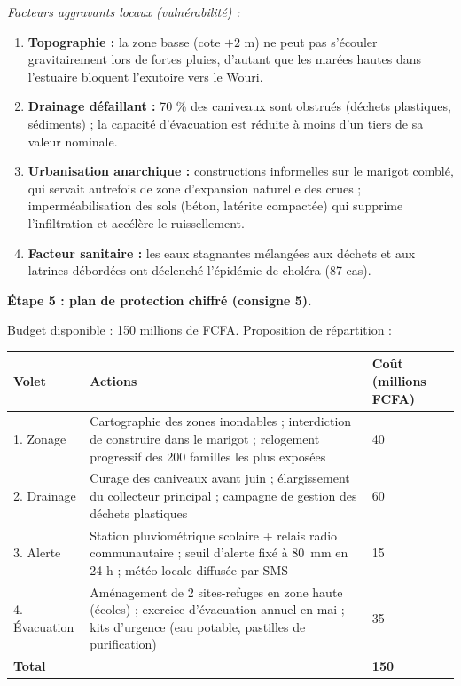 \documentclass[11pt]{article}
\begin{document}
\begin{exoresolu}
\emph{Facteurs aggravants locaux (vulnérabilité) :}
\begin{enumerate}
\item \textbf{Topographie :} la zone basse (cote $+2$ m) ne peut pas s'écouler gravitairement lors de fortes pluies, d'autant que les marées hautes dans l'estuaire bloquent l'exutoire vers le Wouri.
\item \textbf{Drainage défaillant :} 70 \% des caniveaux sont obstrués (déchets plastiques, sédiments) ; la capacité d'évacuation est réduite à moins d'un tiers de sa valeur nominale.
\item \textbf{Urbanisation anarchique :} constructions informelles sur le marigot comblé, qui servait autrefois de zone d'expansion naturelle des crues ; imperméabilisation des sols (béton, latérite compactée) qui supprime l'infiltration et accélère le ruissellement.
\item \textbf{Facteur sanitaire :} les eaux stagnantes mélangées aux déchets et aux latrines débordées ont déclenché l'épidémie de choléra (87 cas).
\end{enumerate}

\textbf{Étape 5 : plan de protection chiffré (consigne 5).}

Budget disponible : 150 millions de FCFA. Proposition de répartition :

\begin{center}
\begin{tabularx}{\linewidth}{|l|X|X|}
\hline
\rowcolor{popblueL}
Volet & Actions & Coût (millions FCFA) \\
\hline
1. Zonage & Cartographie des zones inondables ; interdiction de construire dans le marigot ; relogement progressif des 200 familles les plus exposées & 40 \\
\hline
2. Drainage & Curage des caniveaux avant juin ; élargissement du collecteur principal ; campagne de gestion des déchets plastiques & 60 \\
\hline
3. Alerte & Station pluviométrique scolaire + relais radio communautaire ; seuil d'alerte fixé à \SI{80}{mm} en 24 h ; météo locale diffusée par SMS & 15 \\
\hline
4. Évacuation & Aménagement de 2 sites-refuges en zone haute (écoles) ; exercice d'évacuation annuel en mai ; kits d'urgence (eau potable, pastilles de purification) & 35 \\
\hline
\textbf{Total} & & \textbf{150} \\
\hline
\end{tabularx}
\end{center}


\end{exoresolu}
\end{document}
